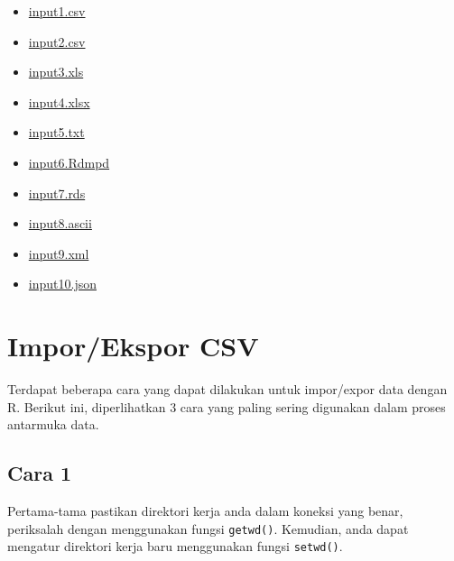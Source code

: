 \documentclass[
]{book}
\providecommand{\tightlist}{%
  \setlength{\itemsep}{0pt}\setlength{\parskip}{0pt}}
\begin{document}
\begin{itemize}
\tightlist
\item
  \href{https://github.com/dsciencelabs/Algoritma_Pemrograman_R/blob/main/Data/Input/input1.csv}{input1.csv}
\item
  \href{https://github.com/dsciencelabs/Algoritma_Pemrograman_R/blob/main/Data/Input/input2.csv}{input2.csv}
\item
  \href{https://github.com/dsciencelabs/Algoritma_Pemrograman_R/blob/main/Data/Input/input3.xls}{input3.xls}
\item
  \href{https://github.com/dsciencelabs/Algoritma_Pemrograman_R/blob/main/Data/Input/input4.xlsx}{input4.xlsx}
\item
  \href{https://github.com/dsciencelabs/Algoritma_Pemrograman_R/blob/main/Data/Input/input5.txt}{input5.txt}
\item
  \href{https://github.com/dsciencelabs/Algoritma_Pemrograman_R/blob/main/Data/Input/input6.Rdmpd}{input6.Rdmpd}
\item
  \href{https://github.com/dsciencelabs/Algoritma_Pemrograman_R/blob/main/Data/Input/input7.rds}{input7.rds}
\item
  \href{https://github.com/dsciencelabs/Algoritma_Pemrograman_R/blob/main/Data/Input/input8.ascii}{input8.ascii}
\item
  \href{https://github.com/dsciencelabs/Algoritma_Pemrograman_R/blob/main/Data/Input/input9.xml}{input9.xml}
\item
  \href{https://github.com/dsciencelabs/Algoritma_Pemrograman_R/blob/main/Data/Input/input10.json}{input10.json}
\end{itemize}

\hypertarget{imporekspor-csv}{%
\section{Impor/Ekspor CSV}\label{imporekspor-csv}}

Terdapat beberapa cara yang dapat dilakukan untuk impor/expor data dengan R. Berikut ini, diperlihatkan 3 cara yang paling sering digunakan dalam proses antarmuka data.

\hypertarget{cara-1}{%
\subsection{Cara 1}\label{cara-1}}

Pertama-tama pastikan direktori kerja anda dalam koneksi yang benar, periksalah dengan menggunakan fungsi \texttt{getwd()}. Kemudian, anda dapat mengatur direktori kerja baru menggunakan fungsi \texttt{setwd()}.
\end{document}

